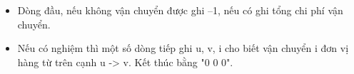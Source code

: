 \begin{itemize}
	\item Dòng đầu, nếu không vận chuyển được ghi –1, nếu có ghi tổng chi phí vận chuyển.
	\item Nếu có nghiệm thì một số dòng tiếp ghi u, v, i cho biết vận chuyển i đơn vị hàng từ trên cạnh u -> v. Kết thúc bằng "0 0 0".
\end{itemize}